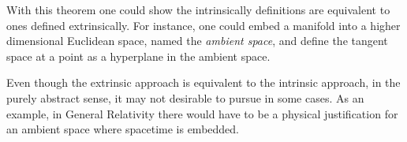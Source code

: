 With this theorem one could show the intrinsically definitions are equivalent to ones defined extrinsically. For instance, one could embed a manifold into a higher dimensional Euclidean space, named the \emph{ambient space}, and define the tangent space at a point as a hyperplane in the ambient space.

Even though the extrinsic approach is equivalent to the intrinsic approach, in the purely abstract sense, it may not desirable to pursue in some cases. As an example, in General Relativity there would have to be a physical justification for an ambient space where spacetime is embedded.

